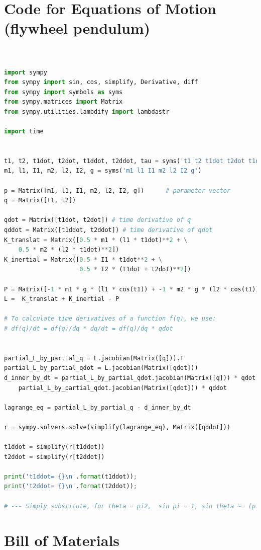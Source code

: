 \documentclass[conference]{IEEEtran}
\begin{document}
\section{Code for Equations of Motion (flywheel pendulum)}
\lstset{basicstyle=\footnotesize\ttfamily,breaklines=true}
\begin{lstlisting}[language=Python,frame=single]  % Start your code-block


import sympy
from sympy import sin, cos, simplify, Derivative, diff
from sympy import symbols as syms
from sympy.matrices import Matrix
from sympy.utilities.lambdify import lambdastr

import time


t1, t2, t1dot, t2dot, t1ddot, t2ddot, tau = syms('t1 t2 t1dot t2dot t1ddot t2ddot tau')
m1, l1, I1, m2, l2, I2, g = syms('m1 l1 I1 m2 l2 I2 g')

p = Matrix([m1, l1, I1, m2, l2, I2, g])      # parameter vector
q = Matrix([t1, t2])

qdot = Matrix([t1dot, t2dot]) # time derivative of q
qddot = Matrix([t1ddot, t2ddot]) # time derivative of qdot
K_translat = Matrix([0.5 * m1 * (l1 * t1dot)**2 + \
    0.5 * m2 * (l2 * t1dot)**2])
K_inertial = Matrix([0.5 * I1 * t1dot**2 + \
                     0.5 * I2 * (t1dot + t2dot)**2])

P = Matrix([-1 * m1 * g * (l1 * cos(t1)) + -1 * m2 * g * (l2 * cos(t1))])
L =  K_translat + K_inertial - P

# To calculate time derivatives of a function f(q), we use:
# df(q)/dt = df(q)/dq * dq/dt = df(q)/dq * qdot


partial_L_by_partial_q = L.jacobian(Matrix([q])).T
partial_L_by_partial_qdot = L.jacobian(Matrix([qdot]))
d_inner_by_dt = partial_L_by_partial_qdot.jacobian(Matrix([q])) * qdot + \
    partial_L_by_partial_qdot.jacobian(Matrix([qdot])) * qddot

lagrange_eq = partial_L_by_partial_q - d_inner_by_dt

r = sympy.solvers.solve(simplify(lagrange_eq), Matrix([qddot]))

t1ddot = simplify(r[t1ddot])
t2ddot = simplify(r[t2ddot])

print('t1ddot= {}\n'.format(t1ddot));
print('t2ddot= {}\n'.format(t2ddot));

# --- Simply substitute, for theta = pi2,  sin pi = 1, sin theta ~= (pi - theta )

\end{lstlisting}


    \section{Bill of Materials}
\end{document}
